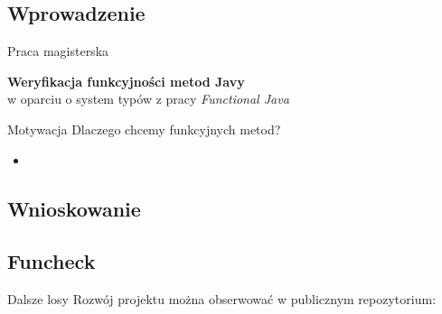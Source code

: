 \documentclass{beamer}
\begin{document}
\subsection{Wprowadzenie}

\begin{frame}{Praca magisterska}
\begin{center}
  \textbf{Weryfikacja funkcyjności metod Javy}\\
  w oparciu o system typów z pracy \emph{Functional Java}
\end{center}
\end{frame}

\begin{frame}{Motywacja}
  Dlaczego chcemy funkcyjnych metod?
  \begin{itemize}
  \item $\quad$  %
  \end{itemize}
\end{frame}

\subsection{Wnioskowanie}



\subsection{Funcheck}

\begin{frame}{Dalsze losy}
Rozwój projektu można obserwować w publicznym repozytorium:
\begin{center}
\vspace{3mm}
\end{center}
\end{frame}
\end{document}
